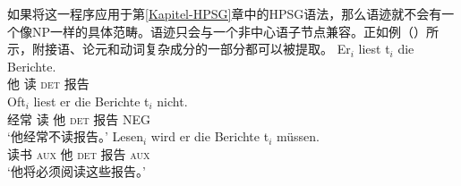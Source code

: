 如果将这一程序应用于第\ref{Kapitel-HPSG}章中的HPSG\indexhpsgc 语法，那么语迹就不会有一个像NP一样的具体范畴。语迹只会与一个非中心语子节点兼容。正如例（）所示，附接语、论元和动词复杂成分的一部分都可以被提取。
\eal
\ex 
\gll Er$_i$ liest t$_i$ die Berichte.\\
	 他 读 {}    \textsc{det} 报告\\
\ex 
\gll Oft$_i$ liest er die Berichte t$_i$ nicht.\\
	 经常 读 他 \textsc{det} 报告 {} NEG\\
\glt `他经常不读报告。'
\ex 
\gll Lesen$_i$ wird er die Berichte t$_i$ müssen.\\
	 读书 \textsc{aux} 他 \textsc{det} 报告 {} \textsc{aux}\\
\glt `他将必须阅读这些报告。'
\zl

